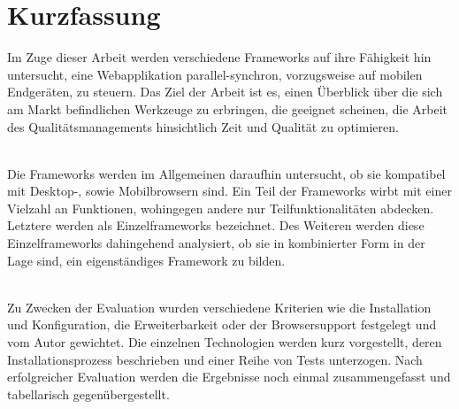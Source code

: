 \section*{Kurzfassung}
Im Zuge dieser Arbeit werden verschiedene Frameworks auf ihre Fähigkeit hin untersucht, eine Webapplikation \gls{parallel-synchron}, vorzugsweise auf mobilen Endgeräten, zu steuern. Das Ziel der Arbeit ist es, einen Überblick über die sich am Markt befindlichen Werkzeuge zu erbringen, die geeignet scheinen, die Arbeit des Qualitätsmanagements hinsichtlich Zeit und Qualität zu optimieren.

\\Die \Gls{Framework}s werden im Allgemeinen daraufhin untersucht, ob sie kompatibel mit Desktop-, sowie Mobilbrowsern sind. Ein Teil der Frameworks wirbt mit einer Vielzahl an Funktionen, wohingegen andere nur Teilfunktionalitäten abdecken. Letztere werden als Einzelframeworks bezeichnet. Des Weiteren werden diese Einzelframeworks dahingehend analysiert, ob sie in kombinierter Form in der Lage sind, ein eigenständiges \Gls{Framework} zu bilden.

\\ Zu Zwecken der Evaluation wurden verschiedene Kriterien wie die Installation und Konfiguration, die Erweiterbarkeit oder der Browsersupport festgelegt und vom Autor gewichtet. Die einzelnen Technologien werden kurz vorgestellt, deren Installationsprozess beschrieben und einer Reihe von Tests unterzogen. Nach erfolgreicher Evaluation werden die Ergebnisse noch einmal zusammengefasst und tabellarisch gegenübergestellt.


%
%

